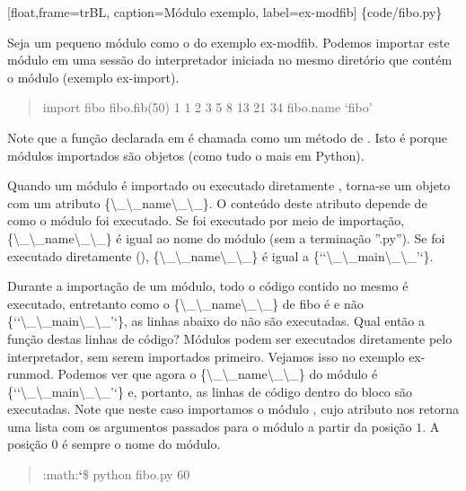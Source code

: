 \documentclass[a4paper,10pt,brazil]{sphinxmanual}
\begin{document}
{[}float,frame=trBL, caption=Módulo exemplo, label=ex-modfib{]} \{code/fibo.py\}

Seja um pequeno módulo como o do exemplo ex-modfib. Podemos
importar este módulo em uma sessão do interpretador iniciada no
mesmo diretório que contém o módulo (exemplo ex-import).
\begin{quote}

import fibo fibo.fib(50) 1 1 2 3 5 8 13 21 34 fibo.name `fibo'
\end{quote}

Note que a função declarada em  é chamada como um método
de . Isto é porque módulos importados são objetos (como
tudo o mais em Python).

Quando um módulo é importado ou executado diretamente , torna-se um
objeto com um atributo \{\textbackslash{}\_\textbackslash{}\_name\textbackslash{}\_\textbackslash{}\_\}. O conteúdo deste
atributo depende de como o módulo foi executado. Se foi executado
por meio de importação, \{\textbackslash{}\_\textbackslash{}\_name\textbackslash{}\_\textbackslash{}\_\} é igual ao nome do
módulo (sem a terminação ''.py''). Se foi executado diretamente
(), \{\textbackslash{}\_\textbackslash{}\_name\textbackslash{}\_\textbackslash{}\_\} é igual a
\{{}`{}`\textbackslash{}\_\textbackslash{}\_main\textbackslash{}\_\textbackslash{}\_'`\}.

Durante a importação de um módulo, todo o código contido no mesmo é
executado, entretanto como o \{\textbackslash{}\_\textbackslash{}\_name\textbackslash{}\_\textbackslash{}\_\} de fibo é
 e não \{{}`{}`\textbackslash{}\_\textbackslash{}\_main\textbackslash{}\_\textbackslash{}\_'`\}, as linhas abaixo
do  não são executadas. Qual então a função destas linhas de
código? Módulos podem ser executados diretamente pelo
interpretador, sem serem importados primeiro. Vejamos isso no
exemplo ex-runmod. Podemos ver que agora o \{\textbackslash{}\_\textbackslash{}\_name\textbackslash{}\_\textbackslash{}\_\}
do módulo é \{{}`{}`\textbackslash{}\_\textbackslash{}\_main\textbackslash{}\_\textbackslash{}\_'`\} e, portanto, as linhas de
código dentro do bloco  são executadas. Note que neste caso
importamos o módulo , cujo atributo  nos retorna uma
lista com os argumentos passados para o módulo a partir da posição
$1$. A posição $0$ é sempre o nome do módulo.
\begin{quote}

:math:{\color{red}\bfseries{}{}`}\$ python fibo.py 60
\end{quote}
\end{document}
